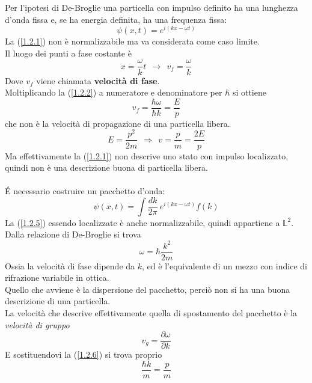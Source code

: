 \documentclass[twoside]{article}
\begin{document}
Per l'ipotesi di De-Broglie una particella con impulso definito ha una lunghezza d'onda fissa e, se ha energia definita, ha una frequenza fissa:
\begin{equation} \label{1.2.1}
    \psi(x,t)=e^{i(kx-\omega t)}
\end{equation}
La (\ref{1.2.1}) non è normalizzabile ma va considerata come caso limite.
\\
Il luogo dei punti a fase costante è
\begin{equation} \label{1.2.2}
    x=\frac{\omega}{k}t \ \ \rightarrow \ \ v_f =\frac{\omega}{k}
\end{equation}
Dove $v_f$ viene chiamata \textbf{velocità di fase}.
\\
Moltiplicando la (\ref{1.2.2}) a numeratore e denominatore per $\hbar$ si ottiene 
\begin{equation}
    v_f=\frac{\hbar \omega}{\hbar k}=\frac{E}{p}
\end{equation}
che non è la velocità di propagazione di una particella libera.
\begin{equation}
    E=\frac{p^2}{2m} \ \ \Rightarrow \ \ v=\frac{p}{m}=\frac{2E}{p}
\end{equation}
Ma effettivamente la (\ref{1.2.1}) non descrive uno stato con impulso localizzato, quindi non è una descrizione buona di particella libera.
\\ \\
\'E necessario costruire un pacchetto d'onda:
\begin{equation} \label{1.2.5}
    \psi(x,t)=\int \frac{dk}{2\pi} \ e^{i(kx-\omega t)}f(k)
\end{equation}
La (\ref{1.2.5}) essendo localizzate è anche normalizzabile, quindi appartiene a $\mathds{L}^2$.
\\
Dalla relazione di De-Broglie si trova 
\begin{equation} \label{1.2.6}
    \omega=\hbar\frac{k^2}{2m}
\end{equation}
Ossia la velocità di fase dipende da $k$, ed è l'equivalente di un mezzo con indice di rifrazione variabile in ottica.
\\
Quello che avviene è la dispersione del pacchetto, perciò non si ha una buona descrizione di una particella.
\\
La velocità che descrive effettivamente quella di spostamento del pacchetto è la \textit{velocità di gruppo}
\begin{equation}
    v_g=\frac{\partial \omega}{\partial k}
\end{equation}
E sostituendovi la (\ref{1.2.6}) si trova proprio
\begin{equation}
    \frac{\hbar k}{m}=\frac{p}{m}
\end{equation}
\end{document}

